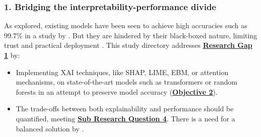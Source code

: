 
\subsubsection*{1. Bridging the interpretability-performance divide}
As explored, existing models have been seen to achieve high accuracies such as 99.7\% in a study by \cite{do2024integrated}. But they are hindered by their black-boxed nature, limiting trust and practical deployment \citep{atlam2022business}. This study directory addresses \hyperref[research-gap-1]{\uline{\textbf{Research Gap 1}}} by:

\begin{itemize}
  \item Implementing XAI techniques, like SHAP, LIME, EBM, or attention mechanisms, on state-of-the-art models such as transformers or random forests in an attempt to preserve model accuracy (\hyperref[objective-2]{\uline{\textbf{Objective 2}}}).
  \item The trade-offs between both explainability and performance should be quantified, meeting \hyperref[sub-research-q4]{\uline{\textbf{Sub Research Question 4}}}. There is a need for a balanced solution by \cite{alzahrani2024explainable}.
\end{itemize}
